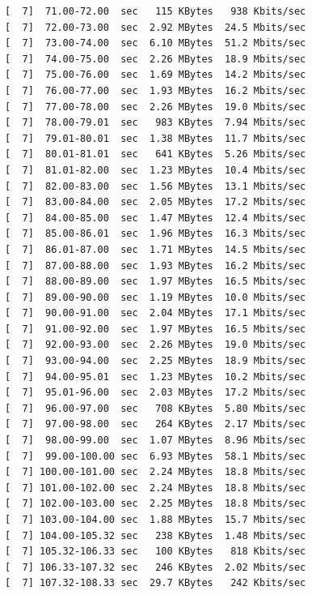 \documentclass[12pt]{article}
\begin{document}
\begin{enumerate}
\begin{latin}
\begin{Verbatim}
[  7]  71.00-72.00  sec   115 KBytes   938 Kbits/sec                  
[  7]  72.00-73.00  sec  2.92 MBytes  24.5 Mbits/sec                  
[  7]  73.00-74.00  sec  6.10 MBytes  51.2 Mbits/sec                  
[  7]  74.00-75.00  sec  2.26 MBytes  18.9 Mbits/sec                  
[  7]  75.00-76.00  sec  1.69 MBytes  14.2 Mbits/sec                  
[  7]  76.00-77.00  sec  1.93 MBytes  16.2 Mbits/sec                  
[  7]  77.00-78.00  sec  2.26 MBytes  19.0 Mbits/sec                  
[  7]  78.00-79.01  sec   983 KBytes  7.94 Mbits/sec                  
[  7]  79.01-80.01  sec  1.38 MBytes  11.7 Mbits/sec                  
[  7]  80.01-81.01  sec   641 KBytes  5.26 Mbits/sec                  
[  7]  81.01-82.00  sec  1.23 MBytes  10.4 Mbits/sec                  
[  7]  82.00-83.00  sec  1.56 MBytes  13.1 Mbits/sec                  
[  7]  83.00-84.00  sec  2.05 MBytes  17.2 Mbits/sec                  
[  7]  84.00-85.00  sec  1.47 MBytes  12.4 Mbits/sec                  
[  7]  85.00-86.01  sec  1.96 MBytes  16.3 Mbits/sec                  
[  7]  86.01-87.00  sec  1.71 MBytes  14.5 Mbits/sec                  
[  7]  87.00-88.00  sec  1.93 MBytes  16.2 Mbits/sec                  
[  7]  88.00-89.00  sec  1.97 MBytes  16.5 Mbits/sec                  
[  7]  89.00-90.00  sec  1.19 MBytes  10.0 Mbits/sec                  
[  7]  90.00-91.00  sec  2.04 MBytes  17.1 Mbits/sec                  
[  7]  91.00-92.00  sec  1.97 MBytes  16.5 Mbits/sec                  
[  7]  92.00-93.00  sec  2.26 MBytes  19.0 Mbits/sec                  
[  7]  93.00-94.00  sec  2.25 MBytes  18.9 Mbits/sec                  
[  7]  94.00-95.01  sec  1.23 MBytes  10.2 Mbits/sec                  
[  7]  95.01-96.00  sec  2.03 MBytes  17.2 Mbits/sec                  
[  7]  96.00-97.00  sec   708 KBytes  5.80 Mbits/sec                  
[  7]  97.00-98.00  sec   264 KBytes  2.17 Mbits/sec                  
[  7]  98.00-99.00  sec  1.07 MBytes  8.96 Mbits/sec                  
[  7]  99.00-100.00 sec  6.93 MBytes  58.1 Mbits/sec                  
[  7] 100.00-101.00 sec  2.24 MBytes  18.8 Mbits/sec                  
[  7] 101.00-102.00 sec  2.24 MBytes  18.8 Mbits/sec                  
[  7] 102.00-103.00 sec  2.25 MBytes  18.8 Mbits/sec                  
[  7] 103.00-104.00 sec  1.88 MBytes  15.7 Mbits/sec                  
[  7] 104.00-105.32 sec   238 KBytes  1.48 Mbits/sec                  
[  7] 105.32-106.33 sec   100 KBytes   818 Kbits/sec                  
[  7] 106.33-107.32 sec   246 KBytes  2.02 Mbits/sec                  
[  7] 107.32-108.33 sec  29.7 KBytes   242 Kbits/sec                  

\end{Verbatim}
\end{latin}
\end{enumerate}
\end{document}
